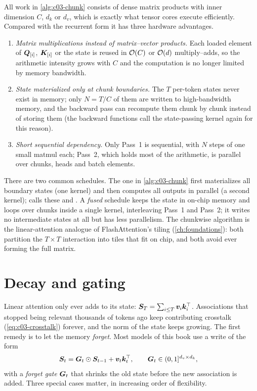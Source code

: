 All work in \cref{alg:c03-chunk} consists of dense matrix products with inner dimension $C$,
$d_k$ or $d_v$, which is exactly what tensor cores execute efficiently. Compared with the
recurrent form it has three hardware advantages.
\begin{enumerate}
\item \emph{Matrix multiplications instead of matrix--vector products.} Each loaded element of
$\bm{Q}_{[i]}$, $\bm{K}_{[i]}$ or the state is reused in $\mathcal{O}(C)$ or $\mathcal{O}(d)$ multiply--adds, so
the arithmetic intensity grows with $C$ and the computation is no longer limited by memory
bandwidth.
\item \emph{State materialized only at chunk boundaries.} The $T$ per-token states never exist
in memory; only $N=T/C$ of them are written to high-bandwidth memory, and the backward pass can
recompute them chunk by chunk instead of storing them (the \fla{} backward functions call the
state-passing kernel again for this reason).
\item \emph{Short sequential dependency.} Only Pass~1 is sequential, with $N$ steps of one
small matmul each; Pass~2, which holds most of the arithmetic, is parallel over chunks, heads
and batch elements.
\end{enumerate}
There are two common schedules. The one in \cref{alg:c03-chunk} first materializes all
boundary states (one kernel) and then computes all outputs in parallel (a second kernel); \fla{}
calls these  and . A \emph{fused} schedule keeps the state
in on-chip memory and loops over chunks inside a single kernel, interleaving Pass~1 and Pass~2;
it writes no intermediate states at all but has less parallelism. The chunkwise algorithm is the
linear-attention analogue of FlashAttention's tiling (\cref{ch:foundations}): both partition the
$T\times T$ interaction into tiles that fit on chip, and both avoid ever forming the full matrix.

\section{Decay and gating}\label{sec:c03-gating}

Linear attention only ever adds to its state:
$\bm{S}_T=\sum_{i\le T}\bm{v}_i\bm{k}_i^{\top}$. Associations that stopped being relevant thousands of tokens
ago keep contributing crosstalk (\cref{eq:c03-crosstalk}) forever, and the norm of the state
keeps growing. The first remedy is to let the memory \emph{forget}. Most models of this book use
a write of the form
\begin{equation}\label{eq:c03-gated-general}
  \bm{S}_t=\bm{G}_t\odot\bm{S}_{t-1}+\bm{v}_t\bm{k}_t^{\top},\qquad \bm{G}_t\in(0,1]^{d_v\times d_k},
\end{equation}
with a \emph{forget gate} $\bm{G}_t$ that shrinks the old state before the new association is
added. Three special cases matter, in increasing order of flexibility.

